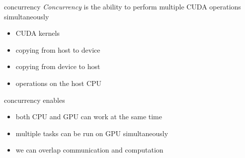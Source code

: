 
\begin{frame}[fragile]{}
    \begin{info}{concurrency}
        \emph{Concurrency} is the ability to perform multiple CUDA operations simultaneously
        \begin{itemize}
            \item CUDA kernels
            \item copying from host to device
            \item copying from device to host
            \item operations on the host CPU
        \end{itemize}
    \end{info}

    \begin{info}{concurrency enables}
        \begin{itemize}
            \item both CPU and GPU can work at the same time
            \item multiple tasks can be run on GPU simultaneously
            \item we can overlap communication and computation
        \end{itemize}
    \end{info}

\end{frame}

